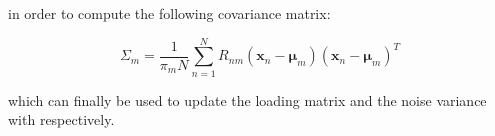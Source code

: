 \documentclass{article}
\newcommand{\E}{\mathbb{E}}
\begin{document}
\noindent in order to compute the following covariance matrix:

\begin{equation}
    \label{eq:mppca_EM_cov}
    \Sigma_m = \frac{1}{\pi_mN}\sum_{n=1}^N R_{nm}\left(\mathbf{x}_n - \boldsymbol{\mu}_m\right)\left(\mathbf{x}_n - \boldsymbol{\mu}_m\right)^T
\end{equation}

\noindent which can finally be used to update the loading matrix and the noise variance with  respectively.



    

\end{document}
